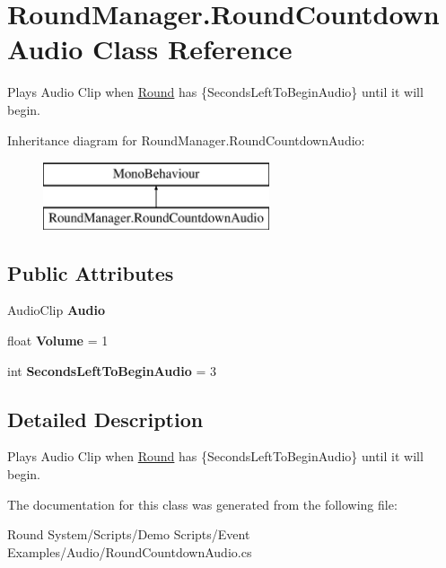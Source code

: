 \hypertarget{class_round_manager_1_1_round_countdown_audio}{}\section{Round\+Manager.\+Round\+Countdown\+Audio Class Reference}
\label{class_round_manager_1_1_round_countdown_audio}


Plays Audio Clip when \hyperlink{class_round_manager_1_1_round}{Round} has \{Seconds\+Left\+To\+Begin\+Audio\} until it will begin.  


Inheritance diagram for Round\+Manager.\+Round\+Countdown\+Audio\+:\begin{figure}[H]
\begin{center}
\leavevmode
\includegraphics[height=2.000000cm]{class_round_manager_1_1_round_countdown_audio}
\end{center}
\end{figure}
\subsection*{Public Attributes}
\begin{DoxyCompactItemize}
\item 
\hypertarget{class_round_manager_1_1_round_countdown_audio_a9de0efa47616fefec19af20859d5e7b8}{}Audio\+Clip {\bfseries Audio}\label{class_round_manager_1_1_round_countdown_audio_a9de0efa47616fefec19af20859d5e7b8}

\item 
\hypertarget{class_round_manager_1_1_round_countdown_audio_a105cb26169c497fa71b9d03e7b8e996a}{}float {\bfseries Volume} = 1\label{class_round_manager_1_1_round_countdown_audio_a105cb26169c497fa71b9d03e7b8e996a}

\item 
\hypertarget{class_round_manager_1_1_round_countdown_audio_a2ac311951e0f99b42e68a126601e4785}{}int {\bfseries Seconds\+Left\+To\+Begin\+Audio} = 3\label{class_round_manager_1_1_round_countdown_audio_a2ac311951e0f99b42e68a126601e4785}

\end{DoxyCompactItemize}


\subsection{Detailed Description}
Plays Audio Clip when \hyperlink{class_round_manager_1_1_round}{Round} has \{Seconds\+Left\+To\+Begin\+Audio\} until it will begin. 



The documentation for this class was generated from the following file\+:\begin{DoxyCompactItemize}
\item 
Round System/\+Scripts/\+Demo Scripts/\+Event Examples/\+Audio/Round\+Countdown\+Audio.\+cs\end{DoxyCompactItemize}
